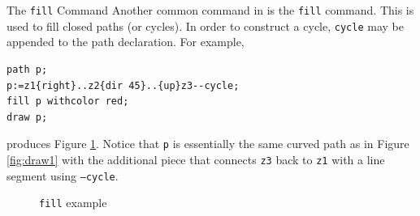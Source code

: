 \begin{subsection}{The \texttt{fill} Command}
Another common command in \MP{} is the \texttt{fill} command.  This is used to fill closed paths (or cycles).  In order to construct a cycle, \texttt{cycle} may be appended to the path declaration.  For example,
\begin{lstlisting}[xleftmargin=7bp]
path p;
p:=z1{right}..z2{dir 45}..{up}z3--cycle;
fill p withcolor red;
draw p;
\end{lstlisting}
produces Figure \ref{fig:fill}.  Notice that \texttt{p} is essentially the same curved path as in Figure \ref{fig:draw1} with the additional piece that connects \texttt{z3} back to \texttt{z1} with a line segment using \texttt{--cycle}.
\begin{figure}[t]
	\begin{center}\end{center}
	\caption{\texttt{fill} example}\label{fig:fill}
\end{figure}


\end{subsection}

